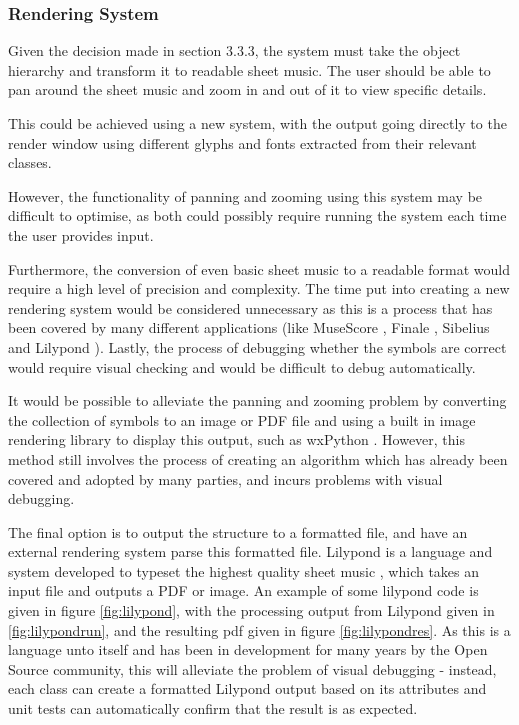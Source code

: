 \subsubsection{Rendering System}
Given the decision made in section 3.3.3, the system must take the object hierarchy and transform it to readable sheet music. The user should be able to pan around the sheet music and zoom in and out of it to view specific details.

This could be achieved using a new system, with the output going directly to the render window using different glyphs and fonts extracted from their relevant classes.

However, the functionality of panning and zooming using this system may be difficult to optimise, as both could possibly require running the system each time the user provides input. 

Furthermore, the conversion of even basic sheet music to a readable format would require a high level of precision and complexity. The time put into creating a new rendering system would be considered unnecessary as this is a process that has been covered by many different applications (like MuseScore \parencite{MuseTour}, Finale \parencite{mxml}, Sibelius \parencite{avid} and Lilypond \parencite{Lilypond}). 
Lastly, the process of debugging whether the symbols are correct would require visual checking and would be difficult to debug automatically.

It would be possible to alleviate the panning and zooming problem by converting the collection of symbols to an image or PDF file and using a built in image rendering library to display this output, such as wxPython \parencite{WX}. However, this method still involves the process of creating an algorithm which has already been covered and adopted by many parties, and incurs problems with visual debugging.

The final option is to output the structure to a formatted file, and have an external rendering system parse this formatted file. Lilypond is a language and system developed to typeset the highest quality sheet music \parencite{Lilypond}, which takes an input file and outputs a PDF or image. An example of some lilypond code is given in figure \ref{fig:lilypond}, with the processing output from Lilypond given in \ref{fig:lilypondrun}, and the resulting pdf given in figure \ref{fig:lilypondres}. As this is a language unto itself and has been in development for many years by the Open Source community, this will alleviate the problem of visual debugging - instead, each class can create a formatted Lilypond output based on its attributes and unit tests can automatically confirm that the result is as expected.

